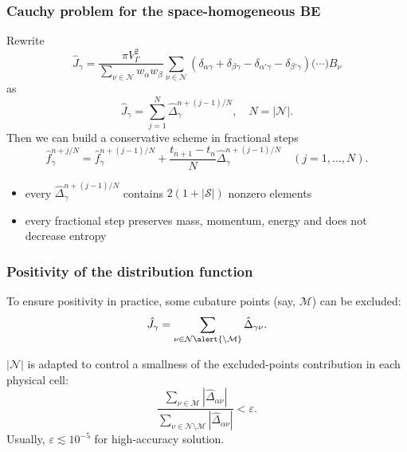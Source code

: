 \documentclass[mathserif]{beamer} %
\newcommand{\Nu}{\mathcal{N}}
\begin{document}
\begin{frame}
    \frametitle{Cauchy problem for the space-homogeneous BE}
    Rewrite
    \begin{equation}
        \hat{J}_\gamma = \frac{\pi V_\Gamma^2}{\sum_{\nu\in\Nu} w_{\alpha}w_{\beta}}
        \sum_{\nu\in\Nu} \left(
            \delta_{\alpha\gamma} + \delta_{\beta\gamma} -
            \delta_{\alpha'\gamma} - \delta_{\beta'\gamma}
        \right)\big(\cdots\big)B_\nu
    \end{equation}
    as
    \begin{equation}
        \hat{J}_{\gamma} = \sum_{j=1}^N \hat{\Delta}_{\gamma}^{n+(j-1)/N}, \quad N=|\Nu|.
    \end{equation}
    Then we can build a conservative scheme in fractional steps
    \begin{equation}\label{eq:fractional_step_scheme}
        \hat{f}_\gamma^{n+j/N} = \hat{f}_\gamma^{n+(j-1)/N} + \frac{t_{n+1}-t_n}{N}\hat{\Delta}_{\gamma}^{n+(j-1)/N}
        \quad (j = 1,\dotsc,N).
    \end{equation}
    \begin{itemize}
        \item every \(\hat{\Delta}_{\gamma}^{n+(j-1)/N}\) contains \(2(1+|\mathcal{S}|)\) nonzero elements
        \item every fractional step preserves mass, momentum, energy and does not decrease entropy
    \end{itemize}
\end{frame}

\begin{frame}
    \frametitle{Positivity of the distribution function}
    To ensure positivity in practice, some cubature points (say, \(\mathcal{M}\)) can be excluded:
    \begin{equation}\label{eq:discrete_short_ci_discarded}
        \hat{J}_\gamma = \sum_{\nu\in\Nu\alert{\setminus\mathcal{M}}} \hat{\Delta}_{\gamma\nu}.
    \end{equation}
    \vspace{10pt}

    \(|\Nu|\) is adapted to control a smallness of the excluded-points contribution in each physical cell:
    \begin{equation}\label{eq:excluded_contribution}
        \frac{\sum_{\nu\in\mathcal{M}} \left| \hat{\Delta}_{\alpha\nu} \right|}
            {\sum_{\nu\in\Nu\setminus\mathcal{M}} \left| \hat{\Delta}_{\alpha\nu} \right|} < \varepsilon.
    \end{equation}
    Usually, \(\varepsilon \lesssim 10^{-5}\) for high-accuracy solution.
\end{frame}
\end{document}
